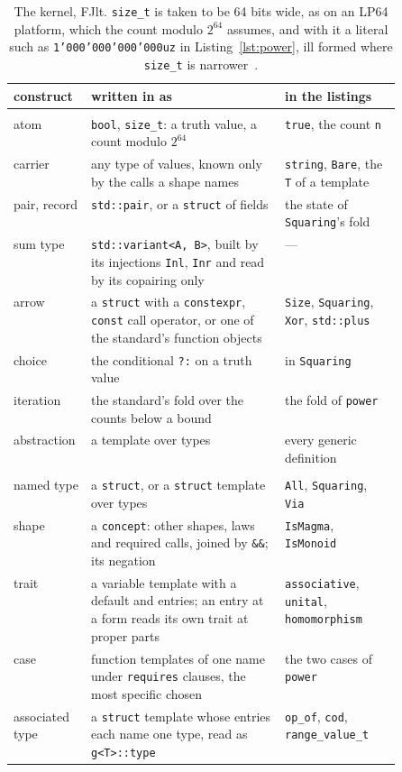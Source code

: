 \begin{table}[tb]
\centering
\small
\begin{tabularx}{\linewidth}{@{}>{\raggedright\arraybackslash}p{0.2\linewidth}>{\raggedright\arraybackslash}X>{\raggedright\arraybackslash}p{0.3\linewidth}@{}}
\toprule
construct & written in \Cpp{} as & in the listings \\
\midrule
\multicolumn{3}{@{}l}{\textit{value layer}} \\
atom & \texttt{bool}, \texttt{size\_t}: a truth value, a count modulo $2^{64}$ & \texttt{true}, the count \texttt{n} \\
carrier & any type of values, known only by the calls a shape names & \texttt{string}, \texttt{Bare}, the \texttt{T} of a template \\
pair, record & \texttt{std::pair}, or a \texttt{struct} of fields & the state of \texttt{Squaring}'s fold \\
sum type & \texttt{std::variant<A, B>}, built by its injections \texttt{Inl}, \texttt{Inr} and read by its copairing only & --- \\
arrow & a \texttt{struct} with a \texttt{constexpr}, \texttt{const} call operator, or one of the standard's function objects & \texttt{Size}, \texttt{Squaring}, \texttt{Xor}, \texttt{std::plus} \\
choice & the conditional \texttt{?:} on a truth value & in \texttt{Squaring} \\
iteration & the standard's fold over the counts below a bound & the fold of \texttt{power} \\
abstraction & a template over types & every generic definition \\
\midrule
\multicolumn{3}{@{}l}{\textit{resolution layer}} \\
named type & a \texttt{struct}, or a \texttt{struct} template over types & \texttt{All}, \texttt{Squaring}, \texttt{Via} \\
shape & a \texttt{concept}: other shapes, laws and required calls, joined by \texttt{\&\&}; its negation & \texttt{IsMagma}, \texttt{IsMonoid} \\
trait & a variable template with a default and entries; an entry at a form reads its own trait at proper parts & \texttt{associative}, \texttt{unital}, \texttt{homomorphism} \\
case & function templates of one name under \texttt{requires} clauses, the most specific chosen & the two cases of \texttt{power} \\
associated type & a \texttt{struct} template whose entries each name one type, read as \texttt{g<T>::type} & \texttt{op\_of}, \texttt{cod}, \texttt{range\_value\_t} \\
\bottomrule
\end{tabularx}
\caption{The kernel, FJlt.
\texttt{size\_t} is taken to be 64 bits wide, as on an LP64 platform, which the count modulo $2^{64}$ assumes, and with it a literal such as \texttt{1'000'000'000'000uz} in Listing~\ref{lst:power}, ill formed where \texttt{size\_t} is narrower~\cite[\texttt{lex.icon}]{cpp23standard}.}
\label{tab:kernel}
\end{table}
